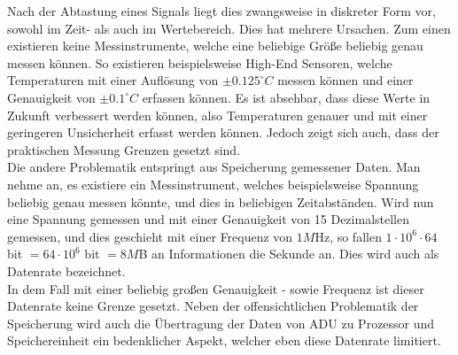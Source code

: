 Nach der Abtastung eines Signals liegt dies zwangsweise in diskreter Form vor, sowohl im Zeit- als auch im Wertebereich. Dies hat mehrere Ursachen. Zum einen existieren keine Messinstrumente, welche eine beliebige Größe beliebig genau messen können. So existieren beispielsweise High-End Sensoren, welche Temperaturen mit einer Auflösung von $\pm0.125^\circ C$ messen können und einer Genauigkeit von $\pm0.1^\circ C$ erfassen können. Es ist absehbar, dass diese Werte in Zukunft verbessert werden können, also Temperaturen genauer und mit einer geringeren Unsicherheit erfasst werden können. Jedoch zeigt sich auch, dass der praktischen Messung Grenzen gesetzt sind.\\
Die andere Problematik entspringt aus Speicherung gemessener Daten. Man nehme an, es existiere ein Messinstrument, welches beispielsweise Spannung beliebig genau messen könnte, und dies in beliebigen Zeitabständen. Wird nun eine Spannung gemessen und mit einer Genauigkeit von 15 Dezimalstellen gemessen, und dies geschieht mit einer Frequenz von $1M$Hz, so fallen $1 \cdot 10^6 \cdot 64$ bit $= 64 \cdot 10^6$ bit $= 8M$B an Informationen die Sekunde an. Dies wird auch als Datenrate bezeichnet.\\
In dem Fall mit einer beliebig großen Genauigkeit - sowie Frequenz ist dieser Datenrate keine Grenze gesetzt. Neben der offensichtlichen Problematik der Speicherung wird auch die Übertragung der Daten von ADU zu Prozessor und Speichereinheit ein bedenklicher Aspekt, welcher eben diese Datenrate limitiert.